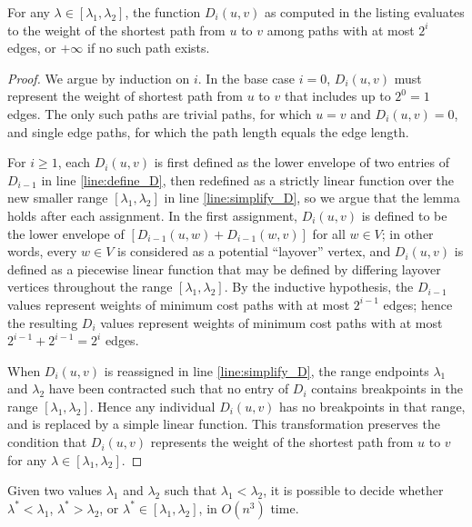 \documentclass{llncs}
\begin{document}
\begin{lemma}
\label{lemma:lambda_star_correct}
For any $\lambda \in [\lambda_1, \lambda_2]$, the function $D_i(u,v)$ as computed in the listing evaluates to the weight of the shortest path from $u$ to $v$ among paths with at most $2^i$ edges, or $+\infty$ if no such path exists.
\end{lemma}

\begin{proof}
We argue by induction on $i$.  In the base case $i=0$, $D_i(u,v)$ must represent the weight of shortest path from $u$ to $v$ that includes up to $2^0=1$ edges.  The only such paths are trivial paths, for which $u=v$ and $D_i(u,v)=0$, and single edge paths, for which the path length equals the edge length.

For $i \geq 1$, each $D_i(u,v)$ is first defined as the lower envelope of two entries of $D_{i-1}$ in line \ref{line:define_D}, then redefined as a strictly linear function over the new smaller range $[\lambda_1, \lambda_2]$ in line \ref{line:simplify_D}, so we argue that the lemma holds after each assignment.  In the first assignment, $D_i(u,v)$ is defined to be the lower envelope of $[D_{i-1}(u,w)+D_{i-1}(w,v)]$ for all $w \in V$; in other words, every $w \in V$ is considered as a potential ``layover'' vertex, and $D_i(u,v)$ is defined as a piecewise linear function that may be defined by differing layover vertices throughout the range $[\lambda_1,\lambda_2]$.  By the inductive hypothesis, the $D_{i-1}$ values represent weights of minimum cost paths with at most $2^{i-1}$ edges; hence the resulting $D_i$ values represent weights of minimum cost paths with at most $2^{i-1}+2^{i-1}=2^i$ edges.

When $D_i(u,v)$ is reassigned in line \ref{line:simplify_D}, the range endpoints $\lambda_1$ and $\lambda_2$ have been contracted such that no entry of $D_i$ contains breakpoints in the range $[\lambda_1, \lambda_2]$.  Hence any individual $D_i(u,v)$ has no breakpoints in that range, and is replaced by a simple linear function.  This transformation preserves the condition that $D_i(u,v)$ represents the weight of the shortest path from $u$ to $v$ for any $\lambda \in [\lambda_1, \lambda_2]$.
\end{proof}

\begin{lemma}
\label{lemma:binary_search_decider}
Given two values $\lambda_1$ and $\lambda_2$ such that $\lambda_1 < \lambda_2$, it is possible to decide whether $\lambda^* < \lambda_1$, $\lambda^* > \lambda_2$, or $\lambda^* \in [\lambda_1, \lambda_2]$, in $O(n^3)$ time.
\end{lemma}
\end{document}
